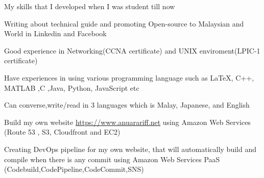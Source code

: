 

\begin{cventries}

  \cventry
    {My skills that I developed when I was student till now} %
    { }%
    {} %
    {} %
    {
      \begin{cvitems} %
        \item {Writing about technical guide and promoting Open-source to Malaysian and World in Linkedin and Facebook}
		\item {Good experience in Networking(CCNA certificate) and UNIX enviroment(LPIC-1 certificate) }
        \item {Have experiences in using various programming language such as \LaTeX , C++, MATLAB ,C ,Java, Python, JavaScript etc}
        \item {Can converse,write/read  in 3 languages which is Malay, Japanese, and English }
		\item {Build my own website \url{https://www.anuarariff.net} using Amazon Web Services (Route 53 , S3, Cloudfront and EC2)}
		\item {Creating DevOps pipeline for my own website, that will automatically build and compile when there is any commit using Amazon Web Services PaaS (Codebuild,CodePipeline,CodeCommit,SNS)}
      \end{cvitems}
    }

\end{cventries}
